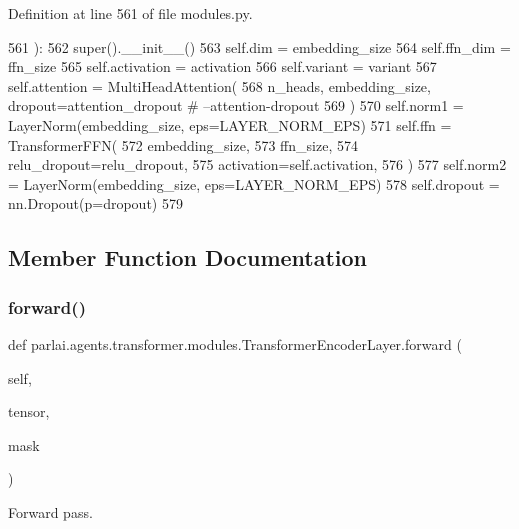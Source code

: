 Definition at line 561 of file modules.\+py.


\begin{DoxyCode}
561     ):
562         super().\_\_init\_\_()
563         self.dim = embedding\_size
564         self.ffn\_dim = ffn\_size
565         self.activation = activation
566         self.variant = variant
567         self.attention = MultiHeadAttention(
568             n\_heads, embedding\_size, dropout=attention\_dropout  \textcolor{comment}{# --attention-dropout}
569         )
570         self.norm1 = LayerNorm(embedding\_size, eps=LAYER\_NORM\_EPS)
571         self.ffn = TransformerFFN(
572             embedding\_size,
573             ffn\_size,
574             relu\_dropout=relu\_dropout,
575             activation=self.activation,
576         )
577         self.norm2 = LayerNorm(embedding\_size, eps=LAYER\_NORM\_EPS)
578         self.dropout = nn.Dropout(p=dropout)
579 
\end{DoxyCode}


\subsection{Member Function Documentation}
\mbox{\label{classparlai_1_1agents_1_1transformer_1_1modules_1_1TransformerEncoderLayer_aba0474eb3a08b6c482648adc0804776e}} 
\subsubsection{\texorpdfstring{forward()}{forward()}}
{\footnotesize\ttfamily def parlai.\+agents.\+transformer.\+modules.\+Transformer\+Encoder\+Layer.\+forward (\begin{DoxyParamCaption}\item[{}]{self,  }\item[{}]{tensor,  }\item[{}]{mask }\end{DoxyParamCaption})}

\begin{DoxyVerb}Forward pass.
\end{DoxyVerb}
 

